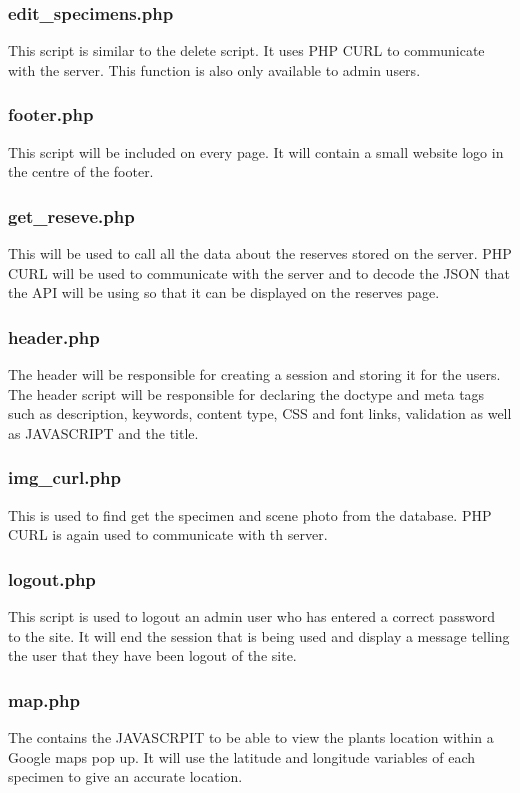     \subsubsection{edit\_specimens.php}
        This script is similar to the delete script. It uses PHP CURL to communicate with the server. This function is also only available to admin users.


    \subsubsection{footer.php}
        This script will be included on every page. It will contain a small website logo in the centre of the footer. 


    \subsubsection{get\_reseve.php}
        This will be used to call all the data about the reserves stored on the server. PHP CURL will be used to communicate with the server and to decode the JSON that the API will be using so that it can be displayed on the reserves page.

    \subsubsection{header.php}
        The header will be responsible for creating a session and storing it for the users. The header script will be responsible for declaring the doctype and meta tags such as description, keywords, content type, CSS and font links, validation as well as JAVASCRIPT and the title. 

    \subsubsection{img\_curl.php}
        This is used to find get the specimen and scene photo from the database. PHP CURL is again used to communicate with th server.

    \subsubsection{logout.php}
        This script is used to logout an admin user who has entered a correct password to the site. It will end the session that is being used and display a message telling the user that they have been logout of the site.

    \subsubsection{map.php}
        The contains the JAVASCRPIT to be able to view the plants location within a Google maps pop up. It will use the latitude and longitude variables of each specimen to give an accurate location.

